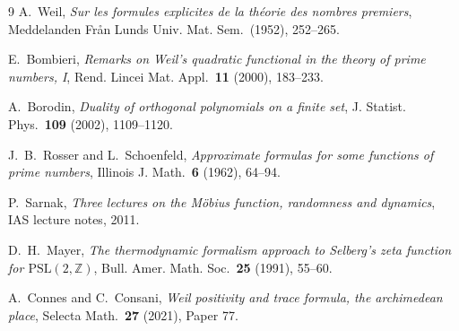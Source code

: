 \documentclass[11pt]{article}
\theoremstyle{remark}
\begin{document}
\begin{thebibliography}{9}
A.~Weil, \emph{Sur les formules explicites de la th\'eorie des
nombres premiers}, Meddelanden Fr\r an Lunds Univ. Mat. Sem.\ (1952),
252--265.

E.~Bombieri, \emph{Remarks on Weil's quadratic functional in the
theory of prime numbers, I}, Rend. Lincei Mat. Appl.\ \textbf{11}
(2000), 183--233.

A.~Borodin, \emph{Duality of orthogonal polynomials on a finite set},
J. Statist. Phys.\ \textbf{109} (2002), 1109--1120.

J.~B.~Rosser and L.~Schoenfeld, \emph{Approximate formulas for some
functions of prime numbers}, Illinois J. Math.\ \textbf{6} (1962),
64--94.

P.~Sarnak, \emph{Three lectures on the M\"obius function,
randomness and dynamics}, IAS lecture notes, 2011.

D.~H.~Mayer, \emph{The thermodynamic formalism approach to Selberg's
zeta function for $\mathrm{PSL}(2,\mathbb Z)$},
Bull. Amer. Math. Soc.\ \textbf{25} (1991), 55--60.

A.~Connes and C.~Consani, \emph{Weil positivity and trace formula,
the archimedean place}, Selecta Math.\ \textbf{27} (2021), Paper 77.
\end{thebibliography}
\end{document}
